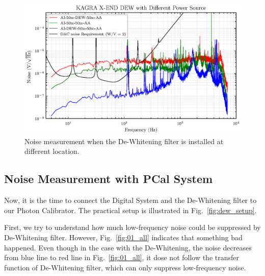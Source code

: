 \begin{figure}[hbt!]
\centering
\includegraphics[width=1\textwidth]{figure/noise/00_DSP}
\caption[Noise measurement when the De-Whitening filter is installed at different location]{ Noise measurement when the De-Whitening filter is installed at different location. }
\label{fig:00_DSP}
\end{figure}

\clearpage

\subsection{Noise Measurement with PCal System}
Now, it is the time to connect the Digital System and the De-Whitening filter to our Photon Calibrator. The practical setup is illustrated in Fig.~\ref{fig:dew_setup}.

First, we try to understand how much low-frequency noise could be suppressed by De-Whitening filter. However, Fig.~\ref{fig:01_all} indicates that something bad happened. Even though in the case with the De-Whitening, the noise decreases from blue line to red line in Fig.~\ref{fig:01_all}, it dose not follow the transfer function of De-Whitening filter, which can only suppress low-frequency noise.

